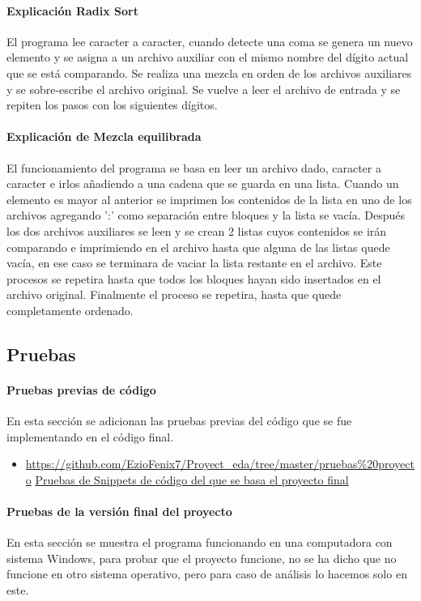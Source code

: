 \documentclass{article}
\begin{document}
	\paragraph*{Explicación Radix Sort}
	El programa lee caracter a caracter, cuando detecte una coma se genera un nuevo elemento y se asigna a un archivo auxiliar con el mismo nombre del dígito 
	actual que se está comparando. Se realiza una mezcla en orden de los archivos auxiliares y se sobre-escribe el archivo original. Se vuelve a leer el
	archivo de entrada y se repiten los pasos con los siguientes dígitos.
	
	\paragraph*{Explicación de Mezcla equilibrada}
	El funcionamiento del programa se basa en leer un archivo dado, caracter a caracter e irlos añadiendo a una cadena que se guarda en una lista. 
	Cuando un elemento es mayor al anterior se imprimen los contenidos de la lista en uno de los archivos agregando ':' como separación entre bloques y la lista se vacía. 
	Después los dos archivos auxiliares se leen y se crean 2 listas cuyos contenidos se irán comparando e imprimiendo en el archivo hasta que alguna de las listas quede vacía, 
	en ese caso se terminara de vaciar la lista restante en el archivo. Este procesos se repetira hasta que todos los bloques hayan sido insertados en el archivo original. 
	Finalmente el proceso se repetira, hasta que quede completamente ordenado.
	
	\subsection{Pruebas}
		\paragraph*{Pruebas previas de código}
		En esta sección se adicionan las pruebas previas del código que se fue implementando en el código final.
		
			\begin{itemize}
				\item \url{https://github.com/EzioFenix7/Proyect_eda/tree/master/pruebas\%20proyecto}
				\href{https://github.com/EzioFenix7/Proyect_eda/tree/master/pruebas\%20proyecto}{ Pruebas de Snippets de código del que se basa el proyecto final}
			\end{itemize}
		
		\paragraph*{Pruebas de la versión final del proyecto}
		En esta sección se muestra el programa funcionando en una computadora con sistema Windows, para probar que el proyecto funcione, no se ha dicho que no funcione en otro sistema operativo, pero para caso de análisis lo hacemos solo en este.
		
\end{document}
